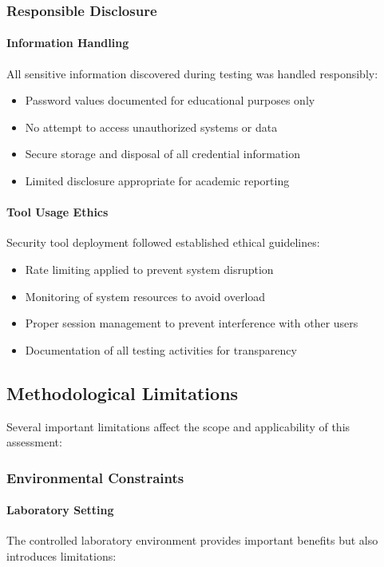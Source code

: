 \subsubsection{Responsible Disclosure}

\paragraph{Information Handling}
All sensitive information discovered during testing was handled responsibly:
\begin{itemize}
    \item Password values documented for educational purposes only
    \item No attempt to access unauthorized systems or data
    \item Secure storage and disposal of all credential information
    \item Limited disclosure appropriate for academic reporting
\end{itemize}

\paragraph{Tool Usage Ethics}
Security tool deployment followed established ethical guidelines:
\begin{itemize}
    \item Rate limiting applied to prevent system disruption
    \item Monitoring of system resources to avoid overload
    \item Proper session management to prevent interference with other users
    \item Documentation of all testing activities for transparency
\end{itemize}

\subsection{Methodological Limitations}

Several important limitations affect the scope and applicability of this assessment:

\subsubsection{Environmental Constraints}

\paragraph{Laboratory Setting}
The controlled laboratory environment provides important benefits but also introduces limitations:

